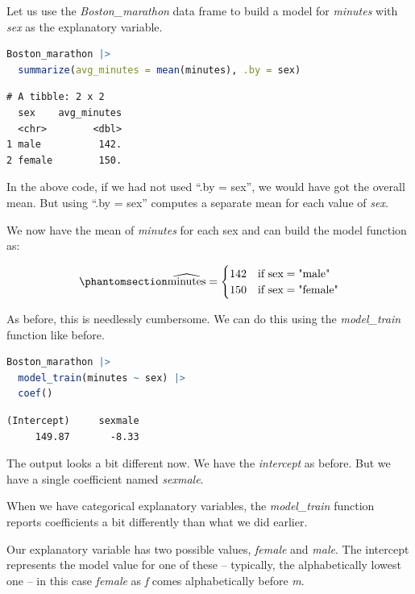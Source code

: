 \documentclass[
  12pt,
  letterpaper,
  DIV=11,
  numbers=noendperiod]{scrreprt}
\begin{document}
Let us use the \emph{Boston\_marathon} data frame to build a model for
\emph{minutes} with \emph{sex} as the explanatory variable.

\begin{lstlisting}[language=R]
Boston_marathon |> 
  summarize(avg_minutes = mean(minutes), .by = sex)
\end{lstlisting}

\begin{lstlisting}
# A tibble: 2 x 2
  sex    avg_minutes
  <chr>        <dbl>
1 male          142.
2 female        150.
\end{lstlisting}

In the above code, if we had not used ``.by = sex'', we would have got
the overall mean. But using ``.by = sex'' computes a separate mean for
each value of \emph{sex}.

We now have the mean of \emph{minutes} for each sex and can build the
model function as:

\begin{equation}\phantomsection\label{eq-boston-marathon-minutes-sex-model}{
\widehat{\text{minutes}} =
\begin{cases}
142 & \text{if } \text{sex} = \text{"male"} \\
150 & \text{if } \text{sex} = \text{"female"}
\end{cases}
}\end{equation}

As before, this is needlessly cumbersome. We can do this using the
\emph{model\_train} function like before.

\begin{lstlisting}[language=R]
Boston_marathon |> 
  model_train(minutes ~ sex) |> 
  coef()
\end{lstlisting}

\begin{lstlisting}
(Intercept)     sexmale 
     149.87       -8.33 
\end{lstlisting}

The output looks a bit different now. We have the \emph{intercept} as
before. But we have a single coefficient named \emph{sexmale}.

When we have categorical explanatory variables, the \emph{model\_train}
function reports coefficients a bit differently than what we did
earlier.

Our explanatory variable has two possible values, \emph{female} and
\emph{male}. The intercept represents the model value for one of these
-- typically, the alphabetically lowest one -- in this case
\emph{female} as \emph{f} comes alphabetically before \emph{m}.
\end{document}
